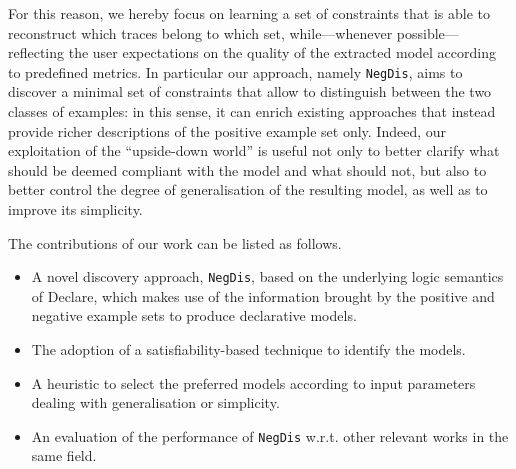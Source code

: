 \documentclass[a4wide,11pt]{article}
\newcommand{\tcolor}[2]{\color{#1}{#2}\color{black}}
\theoremstyle{definition}
\theoremstyle{plain}
\newcommand{\nd}{\texttt{NegDis}\xspace}
\begin{document}

For this reason, we hereby focus on learning a set of constraints that is able to reconstruct which traces belong to which set, while---whenever possible---reflecting the user expectations on the quality of the extracted model according to predefined metrics. 
%
In particular our approach, namely \nd, aims to discover a minimal set of constraints that allow to distinguish between the two classes of examples: in this sense, it can enrich existing approaches that instead provide richer descriptions of the positive example set only. Indeed, our exploitation of the ``upside-down world'' is useful not only to better clarify what should be deemed compliant with the model and what should not, but also to better control the degree of generalisation of the resulting model, as well as to improve its simplicity.

%



The contributions of our work can be listed as follows.
\begin{itemize}
\item A novel discovery approach, \nd, based on the underlying logic semantics of Declare, which makes use of the information brought by the positive and negative example sets to produce declarative models.
\item The adoption of a satisfiability-based technique to identify the models.
\item A heuristic to select the preferred models according to input parameters dealing with generalisation or simplicity.
\item An evaluation of the performance of \nd w.r.t. other relevant works in the same field.
\end{itemize}
\end{document}
